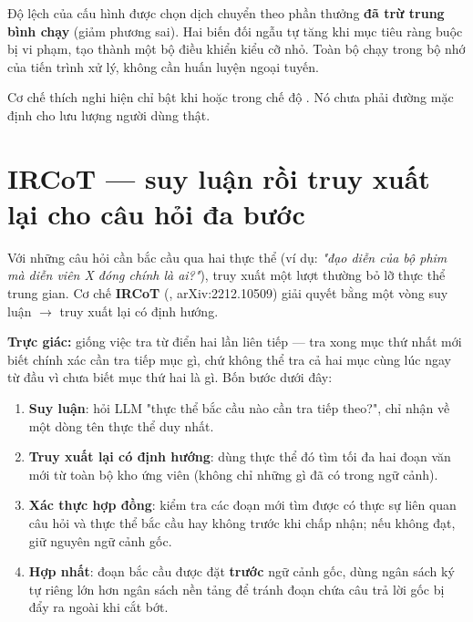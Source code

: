 Độ lệch của cấu hình được chọn dịch chuyển theo phần thưởng \textbf{đã trừ trung bình
chạy} (giảm phương sai). Hai biến đối ngẫu tự tăng khi mục tiêu ràng buộc bị vi phạm, tạo
thành một bộ điều khiển kiểu  cỡ nhỏ. Toàn bộ chạy trong bộ nhớ của tiến
trình xử lý, không cần huấn luyện ngoại tuyến.

\begin{luuy}
Cơ chế thích nghi hiện chỉ bật khi  hoặc trong chế độ
. Nó chưa phải đường mặc định cho lưu lượng người dùng thật.
\end{luuy}

\section{IRCoT — suy luận rồi truy xuất lại cho câu hỏi đa bước}

Với những câu hỏi cần bắc cầu qua hai thực thể (ví dụ: \textit{"đạo diễn của bộ phim mà
diễn viên X đóng chính là ai?"}), truy xuất một lượt thường bỏ lỡ thực thể trung gian. Cơ
chế \textbf{IRCoT} (, arXiv:2212.10509)
giải quyết bằng một vòng suy luận $\rightarrow$ truy xuất lại có định hướng.

\textbf{Trực giác:} giống việc tra từ điển hai lần liên tiếp — tra xong mục thứ nhất mới
biết chính xác cần tra tiếp mục gì, chứ không thể tra cả hai mục cùng lúc ngay từ đầu vì
chưa biết mục thứ hai là gì. Bốn bước dưới đây:

\begin{enumerate}[leftmargin=1.4em]
  \item \textbf{Suy luận}: hỏi LLM "thực thể bắc cầu nào cần tra tiếp theo?", chỉ nhận về
  một dòng tên thực thể duy nhất.
  \item \textbf{Truy xuất lại có định hướng}: dùng thực thể đó tìm tối đa hai đoạn văn mới
  từ toàn bộ kho ứng viên (không chỉ những gì đã có trong ngữ cảnh).
  \item \textbf{Xác thực hợp đồng}: kiểm tra các đoạn mới tìm được có thực sự liên quan
  câu hỏi và thực thể bắc cầu hay không trước khi chấp nhận; nếu không đạt, giữ nguyên
  ngữ cảnh gốc.
  \item \textbf{Hợp nhất}: đoạn bắc cầu được đặt \textbf{trước} ngữ cảnh gốc, dùng ngân
  sách ký tự riêng lớn hơn ngân sách nền tảng để tránh đoạn chứa câu trả lời gốc bị đẩy
  ra ngoài khi cắt bớt.
\end{enumerate}

